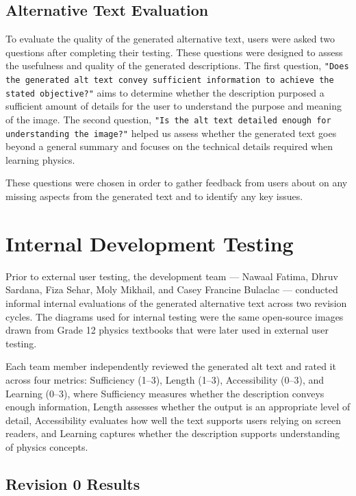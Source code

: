 \documentclass{article}
\begin{document}
\subsection{Alternative Text Evaluation}

To evaluate the quality of the generated alternative text, users were asked two questions after completing their testing. 
These questions were designed to assess the usefulness and quality of the generated descriptions. 
The first question, \texttt{"Does the generated alt text convey sufficient information to achieve the stated objective?"} aims to determine whether 
the description purposed a sufficient amount of details for the user to understand the purpose and meaning of the image. 
The second question, \texttt{"Is the alt text detailed enough for understanding the image?"} helped us assess whether the generated text goes beyond a general summary and focuses on 
the technical details required when learning physics.

These questions were chosen in order to gather feedback from users about on  any missing aspects from the generated text and to identify any key issues. 

\section{Internal Development Testing}

Prior to external user testing, the development team — Nawaal Fatima, Dhruv Sardana, 
Fiza Sehar, Moly Mikhail, and Casey Francine Bulaclac — conducted informal internal 
evaluations of the generated alternative text across two revision cycles. The diagrams 
used for internal testing were the same open-source images drawn from Grade 12 physics 
textbooks that were later used in external user testing.

Each team member independently reviewed the generated alt text and rated it across four 
metrics: Sufficiency (1--3), Length (1--3), Accessibility (0--3), and Learning (0--3), 
where Sufficiency measures whether the description conveys enough information, Length 
assesses whether the output is an appropriate level of detail, Accessibility evaluates 
how well the text supports users relying on screen readers, and Learning captures whether 
the description supports understanding of physics concepts.

\subsection{Revision 0 Results}
\end{document}
